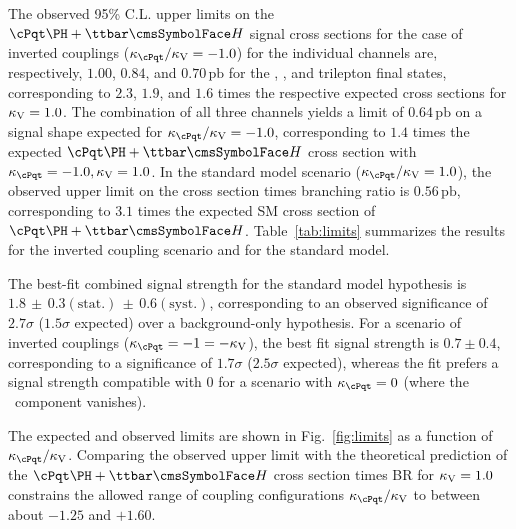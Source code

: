 The observed 95\% C.L. upper limits on the $\tH+\ttH$ signal cross sections for the case of inverted couplings ($\Ct/\CV=-1.0$) for the individual channels are, respectively, $1.00$, $0.84$, and $0.70\,\mathrm{pb}$ for the \mumu, \emu, and trilepton final states, corresponding to $2.3$, $1.9$, and $1.6$ times the respective expected cross sections for $\kappa_\text{V}=1.0$.
The combination of all three channels yields a limit of $0.64\,\mathrm{pb}$ on a signal shape expected for $\Ct/\CV=-1.0$, corresponding to $1.4$ times the expected $\tH+\ttH$ cross section with $\Ct=-1.0, \CV=1.0$.
In the standard model scenario ($\Ct/\CV=1.0$), the observed upper limit on the cross section times branching ratio is $0.56\,\mathrm{pb}$, corresponding to $3.1$ times the expected SM cross section of $\tH+\ttH$.
Table~\ref{tab:limits} summarizes the results for the inverted coupling scenario and for the standard model.

The best-fit combined signal strength for the standard model hypothesis is $1.8\,\pm\,0.3\mathrm{(stat.)}\,\pm\,0.6\mathrm{(syst.)}$, corresponding to an observed significance of $2.7\sigma$ ($1.5\sigma$ expected) over a background-only hypothesis.
For a scenario of inverted couplings ($\Ct=-1=-\CV$), the best fit signal strength is $0.7\pm0.4$, corresponding to a significance of $1.7\sigma$ ($2.5\sigma$ expected), whereas the fit prefers a signal strength compatible with $0$ for a scenario with $\Ct=0$ (where the \ttH\ component vanishes).

The expected and observed limits are shown in Fig.~\ref{fig:limits} as a function of $\Ct/\CV$. %
Comparing the observed upper limit with the theoretical prediction of the $\tH+\ttH$ cross section times BR for $\kappa_\text{V}=1.0$ constrains the allowed range of coupling configurations $\Ct/\CV$ to between about $-1.25$ and $+1.60$.

